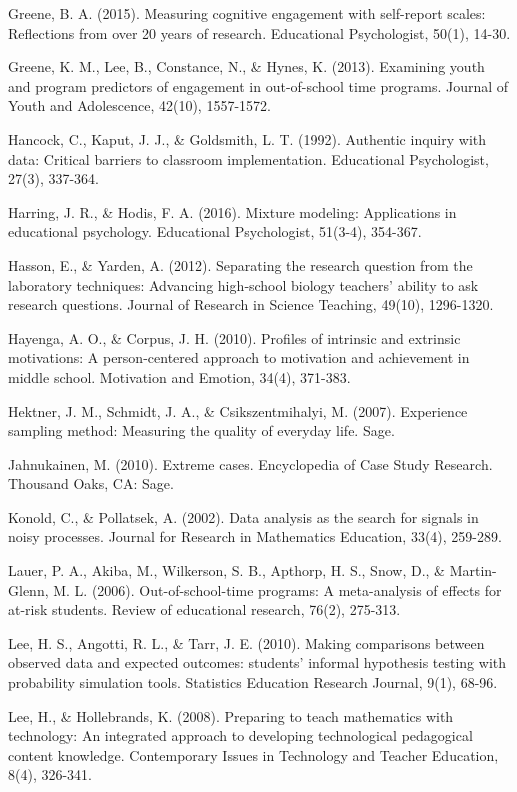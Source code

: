\documentclass[]{msu-thesis}
\theoremstyle{definition}
\theoremstyle{definition}
\theoremstyle{definition}
\theoremstyle{remark}
\begin{document}
Greene, B. A. (2015). Measuring cognitive engagement with self-report
scales: Reflections from over 20 years of research. Educational
Psychologist, 50(1), 14-30.

Greene, K. M., Lee, B., Constance, N., \& Hynes, K. (2013). Examining
youth and program predictors of engagement in out-of-school time
programs. Journal of Youth and Adolescence, 42(10), 1557-1572.

Hancock, C., Kaput, J. J., \& Goldsmith, L. T. (1992). Authentic inquiry
with data: Critical barriers to classroom implementation. Educational
Psychologist, 27(3), 337-364.

Harring, J. R., \& Hodis, F. A. (2016). Mixture modeling: Applications
in educational psychology. Educational Psychologist, 51(3-4), 354-367.

Hasson, E., \& Yarden, A. (2012). Separating the research question from
the laboratory techniques: Advancing high‐school biology teachers'
ability to ask research questions. Journal of Research in Science
Teaching, 49(10), 1296-1320.

Hayenga, A. O., \& Corpus, J. H. (2010). Profiles of intrinsic and
extrinsic motivations: A person-centered approach to motivation and
achievement in middle school. Motivation and Emotion, 34(4), 371-383.

Hektner, J. M., Schmidt, J. A., \& Csikszentmihalyi, M. (2007).
Experience sampling method: Measuring the quality of everyday life.
Sage.

Jahnukainen, M. (2010). Extreme cases. Encyclopedia of Case Study
Research. Thousand Oaks, CA: Sage.

Konold, C., \& Pollatsek, A. (2002). Data analysis as the search for
signals in noisy processes. Journal for Research in Mathematics
Education, 33(4), 259-289.

Lauer, P. A., Akiba, M., Wilkerson, S. B., Apthorp, H. S., Snow, D., \&
Martin-Glenn, M. L. (2006). Out-of-school-time programs: A meta-analysis
of effects for at-risk students. Review of educational research, 76(2),
275-313.

Lee, H. S., Angotti, R. L., \& Tarr, J. E. (2010). Making comparisons
between observed data and expected outcomes: students' informal
hypothesis testing with probability simulation tools. Statistics
Education Research Journal, 9(1), 68-96.

Lee, H., \& Hollebrands, K. (2008). Preparing to teach mathematics with
technology: An integrated approach to developing technological
pedagogical content knowledge. Contemporary Issues in Technology and
Teacher Education, 8(4), 326-341.
\end{document}
